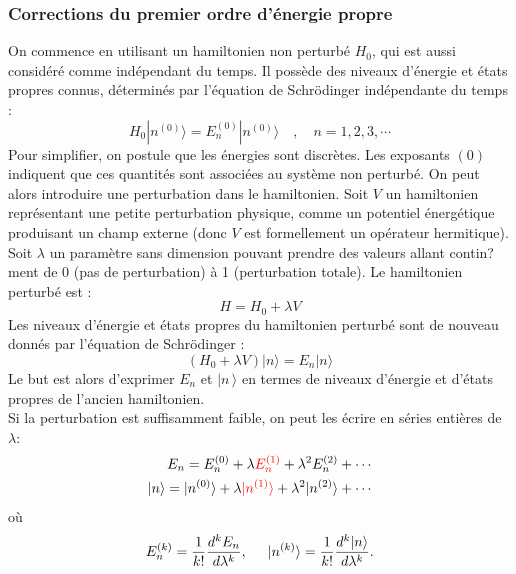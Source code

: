 \subsubsection{Corrections du premier ordre d'\'energie propre}
On commence en utilisant un hamiltonien non perturb\'e $\scriptstyle H_0$, qui est aussi consid\'er\'e comme ind\'ependant du temps. Il poss\`ede des niveaux d'\'energie et \'etats propres connus, d\'etermin\'es par l'\'equation de Schr\"odinger ind\'ependante du temps :
$$
 H_0 |n^{(0)}\rangle = E_n^{(0)} |n^{(0)}\rangle \quad,\quad n = 1, 2, 3, \cdots
$$
Pour simplifier, on postule que les \'energies sont discr\`etes. Les exposants $\scriptstyle (0)$ indiquent que ces quantit\'es sont associ\'ees au syst\`eme non perturb\'e.
On peut alors introduire une perturbation dans le hamiltonien. Soit $\scriptstyle V$ un hamiltonien repr\'esentant une petite perturbation physique, comme un potentiel \'energ\'etique produisant un champ externe (donc $\scriptstyle V$ est formellement un op\'erateur hermitique). Soit $\scriptstyle \lambda$ un param\`etre sans dimension pouvant prendre des valeurs allant contin?ment de 0 (pas de perturbation) \`a 1 (perturbation totale). Le hamiltonien perturb\'e est :
$$
H = H_0 + \lambda V
$$
Les niveaux d'\'energie et \'etats propres du hamiltonien perturb\'e sont de nouveau donn\'es par l'\'equation de Schr\"odinger :
$$
 \left(H_0 + \lambda V \right) |n\rangle = E_n|n\rangle
$$
Le but est alors d'exprimer $\scriptstyle E_n$ et $\scriptstyle\mid n\,\rangle$  en termes de niveaux d'\'energie et d'\'etats propres de l'ancien hamiltonien.\\
Si la perturbation est suffisamment faible, on peut les \'ecrire en s\'eries enti\`eres de $\lambda$:
$$
\begin{aligned}
E_n = E_n^{(0)} + \lambda \red{E_n^{(1)}} + \lambda^2 E_n^{(2)} + \cdots \\
|n\rangle = |n^{(0)}\rangle + \lambda \red{|n^{(1)}\rangle} + \lambda^2 |n^{(2)}\rangle + \cdots
\end{aligned}
$$
o\`u
$$
 E_n^{(k)} = \frac{1}{k!} \frac{d^k E_n}{d \lambda^k} , \hspace{0.5cm}
 |n^{(k)}\rangle = \frac{1}{k!}\frac{d^k |n\rangle }{d \lambda^k}.
$$

